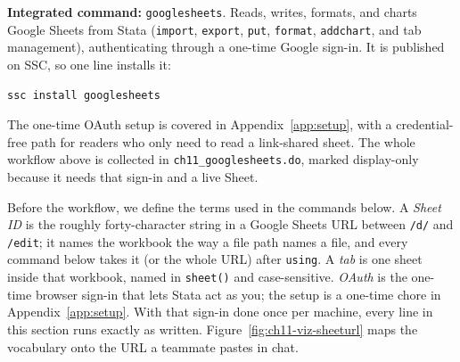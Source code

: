 \documentclass[
    a4paper,
    fontsize=10pt,
    twoside=true,
    numbers=noenddot,
]{kaobook}
\begin{document}
\begin{kaobox}[frametitle=Package Integration: \texttt{googlesheets}]
\textbf{Integrated command:} \texttt{googlesheets}. Reads, writes, formats, and charts Google Sheets from Stata (\texttt{import}, \texttt{export}, \texttt{put}, \texttt{format}, \texttt{addchart}, and tab management), authenticating through a one-time Google sign-in. It is published on SSC, so one line installs it:
\par
{\footnotesize
\begin{verbatim}
ssc install googlesheets
\end{verbatim}
}
The one-time OAuth setup is covered in Appendix~\ref{app:setup}, with a credential-free path for readers who only need to read a link-shared sheet. The whole workflow above is collected in \texttt{ch11\_googlesheets.do}, marked display-only because it needs that sign-in and a live Sheet.
\end{kaobox}

Before the workflow, we define the terms used in the commands below. A \emph{Sheet ID} is the roughly forty-character string in a Google Sheets URL between \texttt{/d/} and \texttt{/edit}; it names the workbook the way a file path names a file, and every command below takes it (or the whole URL) after \texttt{using}. A \emph{tab} is one sheet inside that workbook, named in \texttt{sheet()} and case-sensitive. \emph{OAuth} is the one-time browser sign-in that lets Stata act as you; the setup is a one-time chore in Appendix~\ref{app:setup}. With that sign-in done once per machine, every line in this section runs exactly as written. Figure~\ref{fig:ch11-viz-sheeturl} maps the vocabulary onto the URL a teammate pastes in chat.
\end{document}
